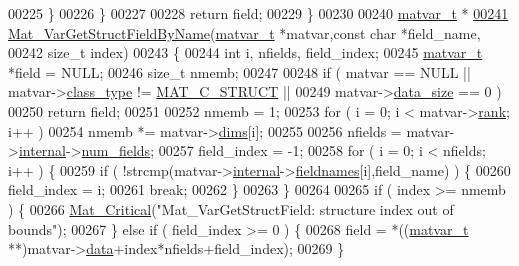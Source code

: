 \begin{DoxyCode}
00225         \}
00226     \}
00227 
00228     \textcolor{keywordflow}{return} field;
00229 \}
00230 
00240 \hyperlink{group___m_a_t_structmatvar__t}{matvar\_t} *
\hyperlink{group___m_a_t_ga619d241b49ce97334a38add60562c7be}{00241} \hyperlink{group___m_a_t_ga619d241b49ce97334a38add60562c7be}{Mat\_VarGetStructFieldByName}(\hyperlink{group___m_a_t_structmatvar__t}{matvar\_t} *matvar,\textcolor{keyword}{const} \textcolor{keywordtype}{char} *field\_name,
00242                             \textcolor{keywordtype}{size\_t} index)
00243 \{
00244     \textcolor{keywordtype}{int}       i, nfields, field\_index;
00245     \hyperlink{group___m_a_t_structmatvar__t}{matvar\_t} *field = NULL;
00246     \textcolor{keywordtype}{size\_t} nmemb;
00247 
00248     \textcolor{keywordflow}{if} ( matvar == NULL || matvar->\hyperlink{group___m_a_t_aff13035bf3265dd7d9425e5d40c839d4}{class\_type} != \hyperlink{group___m_a_t_ggad4d60ae7b709fc81bfd744fb4c857c40acb467c7749c80902b798134c729bb521}{MAT\_C\_STRUCT}   ||
00249         matvar->\hyperlink{group___m_a_t_a9ad1c82e2b568da617e12dc73a26e1f9}{data\_size} == 0 )
00250         \textcolor{keywordflow}{return} field;
00251 
00252     nmemb = 1;
00253     \textcolor{keywordflow}{for} ( i = 0; i < matvar->\hyperlink{group___m_a_t_a84ba70c96ded13cc555fa75b768d9921}{rank}; i++ )
00254         nmemb *= matvar->\hyperlink{group___m_a_t_a8e01234e1c862ce3472bb37f5a09b92c}{dims}[i];
00255 
00256     nfields = matvar->\hyperlink{group___m_a_t_a6e97e3ed9f40c49322c18561c2a94e92}{internal}->\hyperlink{structmatvar__internal_a93fc447484f455eddf9334f2e9e411c2}{num\_fields};
00257     field\_index = -1;
00258     for ( i = 0; i < nfields; i++ ) \{
00259         \textcolor{keywordflow}{if} ( !strcmp(matvar->\hyperlink{group___m_a_t_a6e97e3ed9f40c49322c18561c2a94e92}{internal}->\hyperlink{structmatvar__internal_a7574d000bfc98ad4860ae6590b8d4985}{fieldnames}[i],field\_name) ) \{
00260             field\_index = i;
00261             \textcolor{keywordflow}{break};
00262         \}
00263     \}
00264 
00265     \textcolor{keywordflow}{if} ( index >= nmemb ) \{
00266         \hyperlink{group__mat__util_gaf51f2bfbb5580f575e4dd79757e2b80c}{Mat\_Critical}(\textcolor{stringliteral}{"Mat\_VarGetStructField: structure index out of bounds"});
00267     \} \textcolor{keywordflow}{else} \textcolor{keywordflow}{if} ( field\_index >= 0 ) \{
00268         field = *((\hyperlink{group___m_a_t_structmatvar__t}{matvar\_t} **)matvar->\hyperlink{group___m_a_t_a5672978efa230bbdecdf38ede781f7fa}{data}+index*nfields+field\_index);
00269     \}

\end{DoxyCode}

